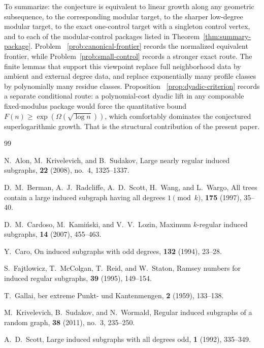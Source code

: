 \documentclass[11pt]{amsart}
\theoremstyle{definition}
\begin{document}
\medskip

To summarize: the conjecture is equivalent to linear growth along any geometric subsequence, to the
corresponding modular target, to the sharper low-degree modular target, to the exact one-control
target with a singleton control vertex, and to each of the modular-control packages listed in
Theorem~\ref{thm:summary-package}. Problem~
\ref{prob:canonical-frontier} records the normalized equivalent frontier, while
Problem~\ref{prob:small-control} records a stronger exact route. The finite lemmas that support
this viewpoint replace full neighborhood data by ambient and external degree data, and replace
exponentially many profile classes by polynomially many residue classes. Proposition~
\ref{prop:dyadic-criterion} records a separate conditional route: a polynomial-cost dyadic lift in
any composable fixed-modulus package would force the quantitative bound
$F(n) \ge \exp(\Omega(\sqrt{\log n}))$, which comfortably dominates the conjectured
superlogarithmic growth. That is the structural
contribution of the present paper.

\begin{thebibliography}{99}

N.~Alon, M.~Krivelevich, and B.~Sudakov,
\newblock Large nearly regular induced subgraphs,
 \textbf{22} (2008), no.~4, 1325--1337.

D.~M.~Berman, A.~J.~Radcliffe, A.~D.~Scott, H.~Wang, and L.~Wargo,
\newblock All trees contain a large induced subgraph having all degrees $1 \pmod k$,
 \textbf{175} (1997), 35--40.

D.~M.~Cardoso, M.~Kami\'nski, and V.~V.~Lozin,
\newblock Maximum $k$-regular induced subgraphs,
 \textbf{14} (2007), 455--463.

Y.~Caro,
\newblock On induced subgraphs with odd degrees,
 \textbf{132} (1994), 23--28.

S.~Fajtlowicz, T.~McColgan, T.~Reid, and W.~Staton,
\newblock Ramsey numbers for induced regular subgraphs,
 \textbf{39} (1995), 149--154.

T.~Gallai,
ber extreme Punkt- und Kantenmengen,
 \textbf{2} (1959), 133--138.

M.~Krivelevich, B.~Sudakov, and N.~Wormald,
\newblock Regular induced subgraphs of a random graph,
 \textbf{38} (2011), no.~3, 235--250.

A.~D.~Scott,
\newblock Large induced subgraphs with all degrees odd,
 \textbf{1} (1992), 335--349.

\end{thebibliography}
\end{document}
